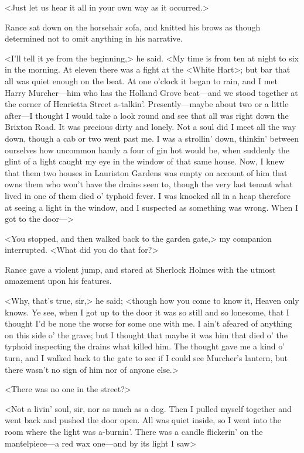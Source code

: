 <Just let us hear it all in your own way as it occurred.>

Rance sat down on the horsehair sofa, and knitted his brows as though determined not to omit anything in his narrative.

<I'll tell it ye from the beginning,> he said. <My time is from ten at night to six in the morning. At eleven there was a fight at the <White Hart>; but bar that all was quiet enough on the beat. At one o'clock it began to rain, and I met Harry Murcher—him who has the Holland Grove beat—and we stood together at the corner of Henrietta Street a-talkin'. Presently—maybe about two or a little after—I thought I would take a look round and see that all was right down the Brixton Road. It was precious dirty and lonely. Not a soul did I meet all the way down, though a cab or two went past me. I was a strollin' down, thinkin' between ourselves how uncommon handy a four of gin hot would be, when suddenly the glint of a light caught my eye in the window of that same house. Now, I knew that them two houses in Lauriston Gardens was empty on account of him that owns them who won't have the drains seen to, though the very last tenant what lived in one of them died o' typhoid fever. I was knocked all in a heap therefore at seeing a light in the window, and I suspected as something was wrong. When I got to the door—>

<You stopped, and then walked back to the garden gate,> my companion interrupted. <What did you do that for?>

Rance gave a violent jump, and stared at Sherlock Holmes with the utmost amazement upon his features.

<Why, that's true, sir,> he said; <though how you come to know it, Heaven only knows. Ye see, when I got up to the door it was so still and so lonesome, that I thought I'd be none the worse for some one with me. I ain't afeared of anything on this side o' the grave; but I thought that maybe it was him that died o' the typhoid inspecting the drains what killed him. The thought gave me a kind o' turn, and I walked back to the gate to see if I could see Murcher's lantern, but there wasn't no sign of him nor of anyone else.>

<There was no one in the street?>

<Not a livin' soul, sir, nor as much as a dog. Then I pulled myself together and went back and pushed the door open. All was quiet inside, so I went into the room where the light was a-burnin'. There was a candle flickerin' on the mantelpiece—a red wax one—and by its light I saw\longdash>

